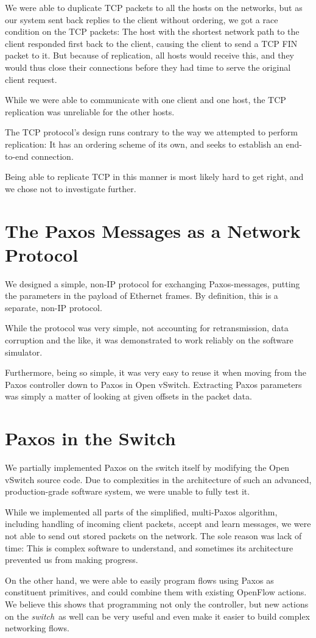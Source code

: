 We were able to duplicate TCP packets to all the hosts on the networks, but
as our system sent back replies to the client without ordering, we got a
race condition on the TCP packets:  The host with the shortest network path
to the client responded first back to the client, causing the client to send
a TCP FIN packet to it.  But because of replication, all hosts would receive
this, and they would thus close their connections before they had time to
serve the original client request.

While we were able to communicate with one client and one host,
the TCP replication was unreliable for the other hosts.

The TCP protocol's design runs contrary to the way we attempted to perform
replication:  It has an ordering scheme of its own, and seeks to establish
an end-to-end connection.

Being able to replicate TCP in this manner is most likely hard to get right,
and we chose not to investigate further.

\section{The Paxos Messages as a Network Protocol}

We designed a simple, non-IP protocol for exchanging Paxos-messages, putting
the parameters in the payload of Ethernet frames.  By definition, this is a
separate, non-IP protocol.

While the protocol was very simple, not accounting for retransmission,
data corruption and the like, it was demonstrated to work reliably on the
software simulator.

Furthermore, being so simple, it was very easy to reuse it when moving from
the Paxos controller down to Paxos in Open vSwitch.  Extracting Paxos
parameters was simply a matter of looking at given offsets in the packet
data.

\section{Paxos in the Switch}

We partially implemented Paxos on the switch itself by modifying the Open
vSwitch source code.  Due to complexities in the architecture of such an
advanced, production-grade software system, we were unable to fully test it.

While we implemented all parts of the simplified, multi-Paxos algorithm,
including handling of incoming client packets, accept and learn
messages, we were not able to send out stored packets on the network.
The sole reason was lack of time: This is complex software to understand,
and sometimes its architecture prevented us from making progress.

On the other hand, we were able to easily program flows using Paxos as
constituent primitives, and could combine them with existing OpenFlow
actions.  We believe this shows that programming not only the controller,
but new actions on the \textit{switch} as well can be very useful and even
make it easier to build complex networking flows.

